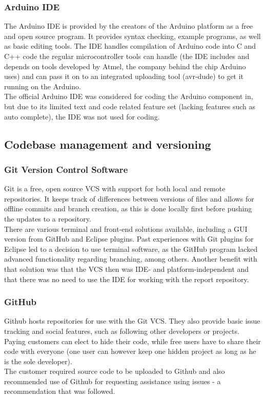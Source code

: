 \subsubsection{Arduino IDE}
The Arduino IDE is provided by the creators of the Arduino platform as a free and open source program. It provides syntax checking, example programs, as well as basic editing tools. The IDE handles compilation of Arduino code into C and C++ code the regular microcontroller tools can handle (the IDE includes and depends on tools developed by Atmel, the company behind the chip Arduino uses) and can pass it on to an integrated uploading tool (avr-dude) to get it running on the Arduino.\\
The official Arduino IDE was considered for coding the Arduino component in, but due to its limited text and code related feature set (lacking features such as auto complete), the IDE was not used for coding.

\subsection{Codebase management and versioning}

\subsubsection{Git Version Control Software}
Git is a free, open source VCS with support for both local and remote repositories. It keeps track of differences between versions of files and allows for offline commits and branch creation, as this is done locally first before pushing the updates to a repository.\\
There are various terminal and front-end solutions available, including a GUI version from GitHub and Eclipse plugins. Past experiences with Git plugins for Eclipse led to a decision to use terminal software, as the GitHub program lacked advanced functionality regarding branching, among others. Another benefit with that solution was that the VCS then was IDE- and platform-independent and that there was no need to use the IDE for working with the report repository.
\subsubsection{GitHub}
Github hosts repositories for use with the Git VCS. They also provide basic issue tracking and social features, such as following other developers or projects. Paying customers can elect to hide their code, while free users have to share their code with everyone (one user can however keep one hidden project as long as he is the sole developer).\\
The customer required source code to be uploaded to Github and also recommended use of Github for requesting assistance using issues - a recommendation that was followed.\\

